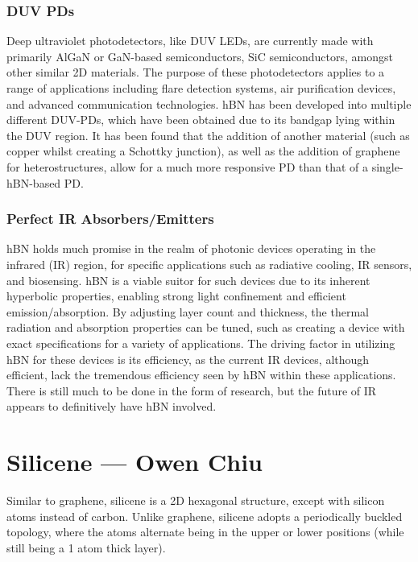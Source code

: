 \documentclass[conference]{IEEEtran}
\begin{document}
  \subsubsection{DUV PDs}

Deep ultraviolet photodetectors, like DUV LEDs, are currently made with primarily AlGaN or GaN-based semiconductors, SiC semiconductors, amongst other similar 2D materials. The purpose of these photodetectors applies to a range of applications including flare detection systems, air purification devices, and advanced communication technologies. hBN has been developed into multiple different DUV-PDs, which have been obtained due to its bandgap lying within the DUV region. It has been found that the addition of another material (such as copper whilst creating a Schottky junction), as well as the addition of graphene for heterostructures, allow for a much more responsive PD than that of a single-hBN-based PD.

  \subsubsection{Perfect IR Absorbers/Emitters}

hBN holds much promise in the realm of photonic devices operating in the infrared (IR) region, for specific applications such as radiative cooling, IR sensors, and biosensing. hBN is a viable suitor for such devices due to its inherent hyperbolic properties, enabling strong light confinement and efficient emission/absorption. By adjusting layer count and thickness, the thermal radiation and absorption properties can be tuned, such as creating a device with exact specifications for a variety of applications. The driving factor in utilizing hBN for these devices is its efficiency, as the current IR devices, although efficient, lack the tremendous efficiency seen by hBN within these applications. There is still much to be done in the form of research, but the future of IR appears to definitively have hBN involved.

\section{Silicene — Owen Chiu}

Similar to graphene, silicene is a 2D hexagonal structure, except with silicon atoms instead of carbon. Unlike graphene, silicene adopts a periodically buckled topology, where the atoms alternate being in the upper or lower positions (while still being a 1 atom thick layer).
\end{document}

